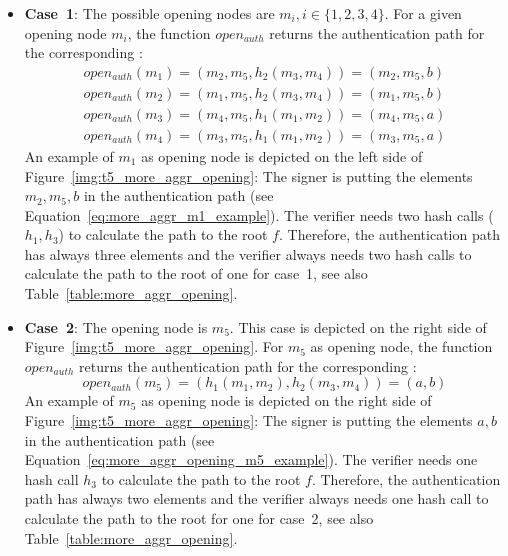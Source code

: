 \begin{itemize}
\item \textbf{Case~1}: The possible opening nodes are $m_i, i \in \{1,2,3,4\}$. For a given opening node $m_i$, the function $open_{auth}$ returns the authentication path for the corresponding \tfblock:
\begin{align}
open_{auth}(m_1) = (m_2, m_5, h_2(m_3, m_4)) = (m_2, m_5, b) \label{eq:more_aggr_m1_example} \\
open_{auth}(m_2) = (m_1, m_5, h_2(m_3, m_4)) = (m_1, m_5, b) \\
open_{auth}(m_3) = (m_4, m_5, h_1(m_1, m_2)) = (m_4, m_5, a) \\
open_{auth}(m_4) = (m_3, m_5, h_1(m_1, m_2)) = (m_3, m_5, a)
\end{align} 
An example of $m_1$ as opening node is depicted on the left side of Figure~\ref{img:t5_more_aggr_opening}: The signer is putting the elements $m_2, m_5, b$ in the authentication path (see Equation~\ref{eq:more_aggr_m1_example}). The verifier needs two hash calls ($h_1, h_3$) to calculate the path to the root $f$.
Therefore, the authentication path has always three elements and the verifier always needs two hash calls to calculate the path to the root of one \tfblock for case~1, see also Table~\ref{table:more_aggr_opening}.

\item \textbf{Case~2}: The opening node is $m_5$. This case is depicted on the right side of Figure~\ref{img:t5_more_aggr_opening}. For $m_5$ as opening node, the function $open_{auth}$ returns the authentication path for the corresponding \tfblock:
\begin{equation}
\label{eq:more_aggr_opening_m5_example}
open_{auth}(m_5) = (h_1(m_1, m_2), h_2(m_3, m_4)) = (a, b)
\end{equation}
An example of $m_5$ as opening node is depicted on the right side of Figure~\ref{img:t5_more_aggr_opening}: The signer is putting the elements $a, b$ in the authentication path (see Equation~\ref{eq:more_aggr_opening_m5_example}). The verifier needs one hash call $h_3$ to calculate the path to the root $f$.
Therefore, the authentication path has always two elements and the verifier always needs one hash call to calculate the path to the root for one \tfblock for case~2, see also Table~\ref{table:more_aggr_opening}.
\end{itemize} 

